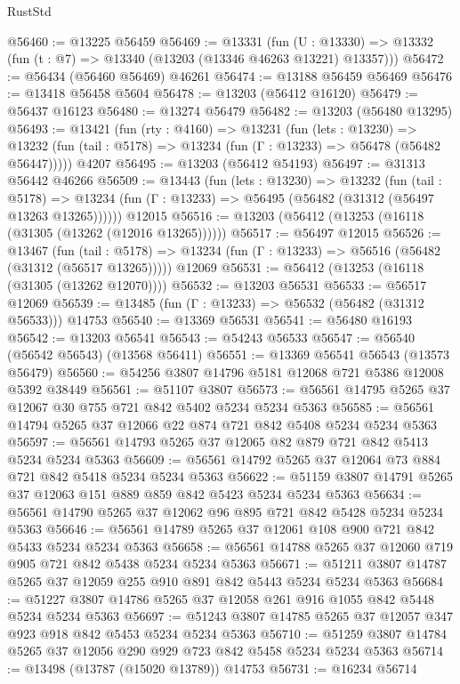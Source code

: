 \begin{lexlean}{RustStd}
\begin{coremodule}
@56460 := @13225 @56459
@56469 := @13331
    (fun (U : @13330) => @13332 (fun (t : @7) => @13340 (@13203 (@13346 @46263 @13221) @13357)))
@56472 := @56434 (@56460 @56469) @46261
@56474 := @13188 @56459 @56469
@56476 := @13418 @56458 @5604
@56478 := @13203 (@56412 @16120)
@56479 := @56437 @16123
@56480 := @13274 @56479
@56482 := @13203 (@56480 @13295)
@56493 := @13421
    (fun (rty : @4160) =>
    @13231
      (fun (lets : @13230) =>
      @13232 (fun (tail : @5178) => @13234 (fun (Γ : @13233) => @56478 (@56482 @56447)))))
    @4207
@56495 := @13203 (@56412 @54193)
@56497 := @31313 @56442 @46266
@56509 := @13443
    (fun (lets : @13230) =>
    @13232
      (fun (tail : @5178) =>
      @13234 (fun (Γ : @13233) => @56495 (@56482 (@31312 (@56497 @13263 @13265))))))
    @12015
@56516 := @13203 (@56412 (@13253 (@16118 (@31305 (@13262 (@12016 @13265))))))
@56517 := @56497 @12015
@56526 := @13467
    (fun (tail : @5178) => @13234 (fun (Γ : @13233) => @56516 (@56482 (@31312 (@56517 @13265)))))
    @12069
@56531 := @56412 (@13253 (@16118 (@31305 (@13262 @12070))))
@56532 := @13203 @56531
@56533 := @56517 @12069
@56539 := @13485 (fun (Γ : @13233) => @56532 (@56482 (@31312 @56533))) @14753
@56540 := @13369 @56531
@56541 := @56480 @16193
@56542 := @13203 @56541
@56543 := @54243 @56533
@56547 := @56540 (@56542 @56543) (@13568 @56411)
@56551 := @13369 @56541 @56543 (@13573 @56479)
@56560 := @54256 @3807 @14796 @5181 @12068 @721 @5386 @12008 @5392 @38449
@56561 := @51107 @3807
@56573 := @56561 @14795 @5265 @37 @12067 @30 @755 @721 @842 @5402 @5234 @5234 @5363
@56585 := @56561 @14794 @5265 @37 @12066 @22 @874 @721 @842 @5408 @5234 @5234 @5363
@56597 := @56561 @14793 @5265 @37 @12065 @82 @879 @721 @842 @5413 @5234 @5234 @5363
@56609 := @56561 @14792 @5265 @37 @12064 @73 @884 @721 @842 @5418 @5234 @5234 @5363
@56622 := @51159 @3807 @14791 @5265 @37 @12063 @151 @889 @859 @842 @5423 @5234 @5234 @5363
@56634 := @56561 @14790 @5265 @37 @12062 @96 @895 @721 @842 @5428 @5234 @5234 @5363
@56646 := @56561 @14789 @5265 @37 @12061 @108 @900 @721 @842 @5433 @5234 @5234 @5363
@56658 := @56561 @14788 @5265 @37 @12060 @719 @905 @721 @842 @5438 @5234 @5234 @5363
@56671 := @51211 @3807 @14787 @5265 @37 @12059 @255 @910 @891 @842 @5443 @5234 @5234 @5363
@56684 := @51227 @3807 @14786 @5265 @37 @12058 @261 @916 @1055 @842 @5448 @5234 @5234 @5363
@56697 := @51243 @3807 @14785 @5265 @37 @12057 @347 @923 @918 @842 @5453 @5234 @5234 @5363
@56710 := @51259 @3807 @14784 @5265 @37 @12056 @290 @929 @723 @842 @5458 @5234 @5234 @5363
@56714 := @13498 (@13787 (@15020 @13789)) @14753
@56731 := @16234
    @56714

\end{coremodule}
\end{lexlean}
